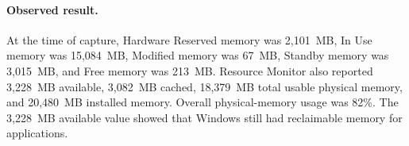 \paragraph{Observed result.}
At the time of capture, Hardware Reserved memory was 2,101~MB, In Use memory was
15,084~MB, Modified memory was 67~MB, Standby memory was 3,015~MB, and Free
memory was 213~MB. Resource Monitor also reported 3,228~MB available,
3,082~MB cached, 18,379~MB total usable physical memory, and 20,480~MB installed
memory. Overall physical-memory usage was 82\%. The 3,228~MB available value
showed that Windows still had reclaimable memory for applications.
